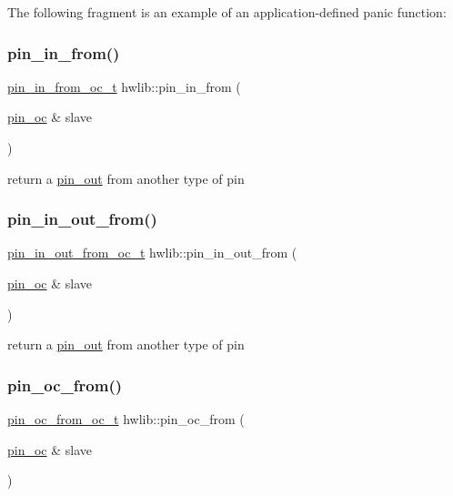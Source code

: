 The following fragment is an example of an application-\/defined panic function\+: 
\begin{DoxyCodeInclude}
\end{DoxyCodeInclude}
\mbox{\label{namespacehwlib_a2f8ff4c157c60783c37db6bb1e11e3a4}} 
\subsubsection{\texorpdfstring{pin\+\_\+in\+\_\+from()}{pin\_in\_from()}}
{\footnotesize\ttfamily \hyperlink{classhwlib_1_1pin__in__from__oc__t}{pin\+\_\+in\+\_\+from\+\_\+oc\+\_\+t} hwlib\+::pin\+\_\+in\+\_\+from (\begin{DoxyParamCaption}\item[{\hyperlink{classhwlib_1_1pin__oc}{pin\+\_\+oc} \&}]{slave }\end{DoxyParamCaption})}

return a \hyperlink{classhwlib_1_1pin__out}{pin\+\_\+out} from another type of pin \mbox{\label{namespacehwlib_ab2c0c1d086f745d266ad2d247187f65f}} 
\subsubsection{\texorpdfstring{pin\+\_\+in\+\_\+out\+\_\+from()}{pin\_in\_out\_from()}}
{\footnotesize\ttfamily \hyperlink{classhwlib_1_1pin__in__out__from__oc__t}{pin\+\_\+in\+\_\+out\+\_\+from\+\_\+oc\+\_\+t} hwlib\+::pin\+\_\+in\+\_\+out\+\_\+from (\begin{DoxyParamCaption}\item[{\hyperlink{classhwlib_1_1pin__oc}{pin\+\_\+oc} \&}]{slave }\end{DoxyParamCaption})}

return a \hyperlink{classhwlib_1_1pin__out}{pin\+\_\+out} from another type of pin \mbox{\label{namespacehwlib_aa2c63efcb24f3d5124567356d8c8a804}} 
\subsubsection{\texorpdfstring{pin\+\_\+oc\+\_\+from()}{pin\_oc\_from()}}
{\footnotesize\ttfamily \hyperlink{classhwlib_1_1pin__oc__from__oc__t}{pin\+\_\+oc\+\_\+from\+\_\+oc\+\_\+t} hwlib\+::pin\+\_\+oc\+\_\+from (\begin{DoxyParamCaption}\item[{\hyperlink{classhwlib_1_1pin__oc}{pin\+\_\+oc} \&}]{slave }\end{DoxyParamCaption})}

